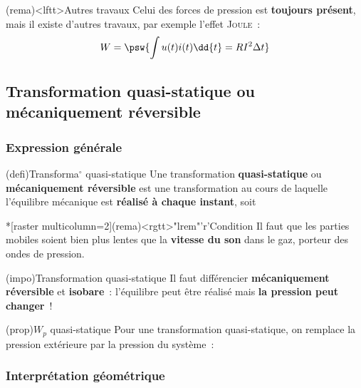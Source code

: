 \documentclass[../../main/main.tex]{subfiles}
\begin{document}
\begin{tcb}(rema)<lftt>{Autres travaux}
	Celui des forces de pression est \textbf{toujours présent}, mais
	il existe d'autres travaux, par exemple l'effet \textsc{Joule}~:
	\[
		W = \psw{\int u(t)i(t)\dd{t} = RI^2 \Delta{t}}
	\]
\end{tcb}

\subsection{Transformation quasi-statique ou mécaniquement réversible}
\subsubsection{Expression générale}

\begin{tcbraster}[raster equal height=rows, raster columns=5]
	\begin{tcb*}[raster multicolumn=3](defi){Transforma$^\circ$ quasi-statique}
		Une transformation \textbf{quasi-statique} ou \textbf{mécaniquement
			réversible} est une transformation au cours de laquelle l'équilibre mécanique
		est \textbf{réalisé à chaque instant}, soit
		\psw{%
			\[
				\boxed{P = P\ind{ext}}
			\]
		}%
		\vspace{-15pt}
	\end{tcb*}
	\begin{tcb}*[raster multicolumn=2](rema)<rgtt>"lrem"'r'{Condition}
		Il faut que les parties mobiles soient bien plus lentes que la \textbf{vitesse
			du son} dans le gaz, porteur des ondes de pression.
	\end{tcb}
\end{tcbraster}

\begin{tcb*}(impo){Transformation quasi-statique}
	Il faut différencier \textbf{mécaniquement réversible} et \textbf{isobare}~:
	l'équilibre peut être réalisé mais \textbf{la pression peut changer}~!
\end{tcb*}
\begin{tcb*}(prop){$W_p$ quasi-statique}
	Pour une transformation quasi-statique, on remplace la pression extérieure par
	la pression du système~:
	\psw{%
		\[
			\boxed{W_p = - \int_{V_i}^{V_f}P \dd{V}}
		\]
	}%
\end{tcb*}

\vspace{-15pt}
\subsubsection{Interprétation géométrique}
\end{document}
